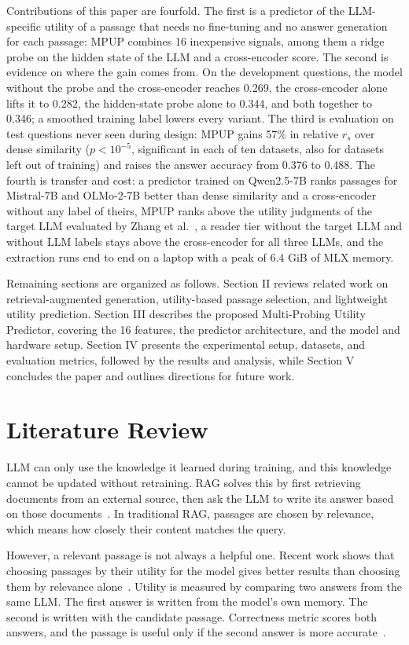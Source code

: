 \documentclass[conference]{IEEEtran}
\begin{document}
Contributions of this paper are fourfold. The first is a predictor of the LLM-specific utility of a passage that needs no fine-tuning and no answer generation for each passage: MPUP combines 16 inexpensive signals, among them a ridge probe on the hidden state of the LLM and a cross-encoder score. The second is evidence on where the gain comes from. On the development questions, the model without the probe and the cross-encoder reaches 0.269, the cross-encoder alone lifts it to 0.282, the hidden-state probe alone to 0.344, and both together to 0.346; a smoothed training label lowers every variant. The third is evaluation on test questions never seen during design: MPUP gains 57\% in relative $r_s$ over dense similarity ($p < 10^{-5}$, significant in each of ten datasets, also for datasets left out of training) and raises the answer accuracy from 0.376 to 0.488. The fourth is transfer and cost: a predictor trained on Qwen2.5-7B ranks passages for Mistral-7B and OLMo-2-7B better than dense similarity and a cross-encoder without any label of theirs, MPUP ranks above the utility judgments of the target LLM evaluated by Zhang et al.~\cite{zhang2025c}, a reader tier without the target LLM and without LLM labels stays above the cross-encoder for all three LLMs, and the extraction runs end to end on a laptop with a peak of 6.4 GiB of MLX memory.

Remaining sections are organized as follows. Section II reviews related work on retrieval-augmented generation, utility-based passage selection, and lightweight utility prediction. Section III describes the proposed Multi-Probing Utility Predictor, covering the 16 features, the predictor architecture, and the model and hardware setup. Section IV presents the experimental setup, datasets, and evaluation metrics, followed by the results and analysis, while Section V concludes the paper and outlines directions for future work.

\section{Literature Review}
LLM can only use the knowledge it learned during training, and this knowledge cannot be updated without retraining. RAG solves this by first retrieving documents from an external source, then ask the LLM to write its answer based on those documents~\cite{fan2024}. In traditional RAG, passages are chosen by relevance, which means how closely their content matches the query.

However, a relevant passage is not always a helpful one. Recent work shows that choosing passages by their utility for the model gives better results than choosing them by relevance alone~\cite{zhang2026}. Utility is measured by comparing two answers from the same LLM. The first answer is written from the model’s own memory. The second is written with the candidate passage. Correctness metric scores both answers, and the passage is useful only if the second answer is more accurate~\cite{zhang2026}.
\end{document}
